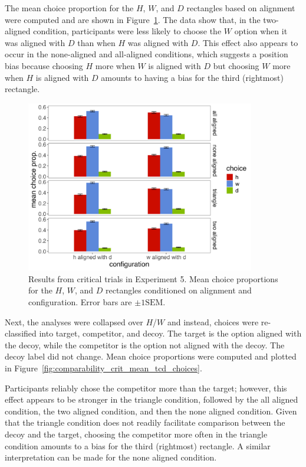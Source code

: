 The mean choice proportion for the $H$, $W$, and $D$ rectangles based on alignment were computed and are shown in Figure~\ref{fig:comparability_crit_mean_choices}. The data show that, in the two-aligned condition, participants were less likely to choose the $W$ option when it was aligned with $D$ than when $H$ was aligned with $D$. This effect also appears to occur in the none-aligned and all-aligned conditions, which suggests a position bias because choosing $H$ more when $W$ is aligned with $D$ but choosing $W$ more when $H$ is aligned with $D$ amounts to having a bias for the third (rightmost) rectangle.

\begin{figure}
   \includegraphics[width=100mm]{figures/comparability_crit_mean_hdw_choice_by_config_align.jpeg}
   \caption{Results from critical trials in Experiment 5. Mean choice proportions for the $H$, $W$, and $D$ rectangles conditioned on alignment and configuration. Error bars are $\pm1\mathrm{SEM}$.}
   \label{fig:comparability_crit_mean_choices}
\end{figure}

Next, the analyses were collapsed over $H$/$W$ and instead, choices were re-classified into target, competitor, and decoy. The target is the option aligned with the decoy, while the competitor is the option not aligned with the decoy. The decoy label did not change. Mean choice proportions were computed and plotted in Figure~\ref{fig:comparability_crit_mean_tcd_choices}.

Participants reliably chose the competitor more than the target; however, this effect appears to be stronger in the triangle condition, followed by the all aligned condition, the two aligned condition, and then the none aligned condition. Given that the triangle condition does not readily facilitate comparison between the decoy and the target, choosing the competitor more often in the triangle condition amounts to a bias for the third (rightmost) rectangle. A similar interpretation can be made for the none aligned condition. 

